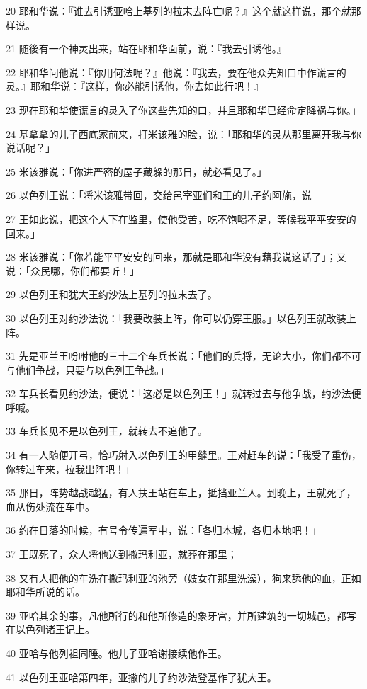 \par 20 耶和华说：『谁去引诱亚哈上基列的拉末去阵亡呢？』这个就这样说，那个就那样说。
\par 21 随後有一个神灵出来，站在耶和华面前，说：『我去引诱他。』
\par 22 耶和华问他说：『你用何法呢？』他说：『我去，要在他众先知口中作谎言的灵。』耶和华说：『这样，你必能引诱他，你去如此行吧！』
\par 23 现在耶和华使谎言的灵入了你这些先知的口，并且耶和华已经命定降祸与你。」
\par 24 基拿拿的儿子西底家前来，打米该雅的脸，说：「耶和华的灵从那里离开我与你说话呢？」
\par 25 米该雅说：「你进严密的屋子藏躲的那日，就必看见了。」
\par 26 以色列王说：「将米该雅带回，交给邑宰亚们和王的儿子约阿施，说
\par 27 王如此说，把这个人下在监里，使他受苦，吃不饱喝不足，等候我平平安安的回来。」
\par 28 米该雅说：「你若能平平安安的回来，那就是耶和华没有藉我说这话了」；又说：「众民哪，你们都要听！」
\par 29 以色列王和犹大王约沙法上基列的拉末去了。
\par 30 以色列王对约沙法说：「我要改装上阵，你可以仍穿王服。」以色列王就改装上阵。
\par 31 先是亚兰王吩咐他的三十二个车兵长说：「他们的兵将，无论大小，你们都不可与他们争战，只要与以色列王争战。」
\par 32 车兵长看见约沙法，便说：「这必是以色列王！」就转过去与他争战，约沙法便呼喊。
\par 33 车兵长见不是以色列王，就转去不追他了。
\par 34 有一人随便开弓，恰巧射入以色列王的甲缝里。王对赶车的说：「我受了重伤，你转过车来，拉我出阵吧！」
\par 35 那日，阵势越战越猛，有人扶王站在车上，抵挡亚兰人。到晚上，王就死了，血从伤处流在车中。
\par 36 约在日落的时候，有号令传遍军中，说：「各归本城，各归本地吧！」
\par 37 王既死了，众人将他送到撒玛利亚，就葬在那里；
\par 38 又有人把他的车洗在撒玛利亚的池旁（妓女在那里洗澡），狗来舔他的血，正如耶和华所说的话。
\par 39 亚哈其余的事，凡他所行的和他所修造的象牙宫，并所建筑的一切城邑，都写在以色列诸王记上。
\par 40 亚哈与他列祖同睡。他儿子亚哈谢接续他作王。
\par 41 以色列王亚哈第四年，亚撒的儿子约沙法登基作了犹大王。

